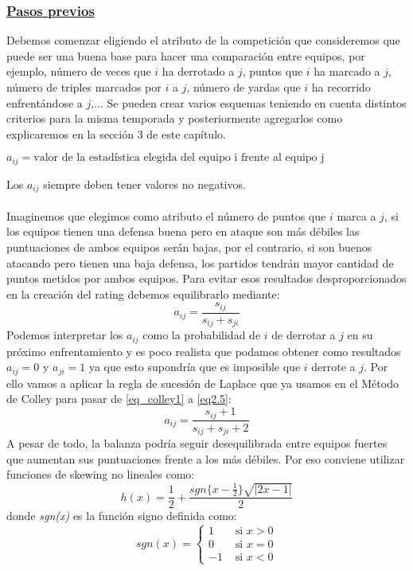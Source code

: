 \subsubsection*{\underline{Pasos previos}}
Debemos comenzar eligiendo el atributo de la competición que consideremos que puede ser una buena base para hacer una comparación entre equipos, por ejemplo, número de veces que $i$ ha derrotado a $j$, puntos que $i$ ha marcado a $j$, número de triples marcados por $i$ a $j$, número de yardas que $i$ ha recorrido enfrentándose a $j$,... Se pueden crear varios esquemas teniendo en cuenta distintos criterios para la misma temporada y posteriormente agregarlos como explicaremos en la sección 3 de este capítulo.
\begin{center}
	$a_{ij} = \text{valor de la estadística elegida del equipo i frente al equipo j}$
\end{center}
Los $a_{ij}$ siempre deben tener valores no negativos.\\
\\
Imaginemos que elegimos como atributo el número de puntos que $i$ marca a $j$, si los equipos tienen una defensa buena pero en ataque son más débiles las puntuaciones de ambos equipos serán bajas, por el contrario, si son buenos atacando pero tienen una baja defensa, los partidos tendrán mayor cantidad de puntos metidos por ambos equipos. Para evitar esos resultados desproporcionados en la creación del rating debemos equilibrarlo mediante:
\begin{equation}
a_{ij} = \dfrac{s_{ij}}{s_{ij}+s_{ji}}
\end{equation}
Podemos interpretar los $a_{ij}$ como la probabilidad de $i$ de derrotar a $j$ en su próximo enfrentamiento y es poco realista que podamos obtener como resultados $a_{ij}=0$ y $a_{ji}=1$ ya que esto supondría que es imposible que $i$ derrote a $j$. Por ello vamos a aplicar la regla de sucesión de Laplace que ya usamos en el Método de Colley para pasar de \ref{eq_colley1} a \ref{eq2.5}:
\begin{equation}
a_{ij} = \dfrac{s_{ij}+1}{s_{ij}+s_{ji}+2} \label{formejem6}
\end{equation}
A pesar de todo, la balanza podría seguir desequilibrada entre equipos fuertes que aumentan sus puntuaciones frente a los más débiles. Por eso conviene utilizar funciones de skewing no lineales como:
\begin{equation}
h(x) = \frac{1}{2} + \dfrac{sgn\{x-\frac{1}{2}\} \sqrt{|2x-1|}}{2} 
\end{equation} 
donde \textit{sgn(x)} es la función signo definida como:
\begin{equation*}
sgn(x) = \begin{cases}
1 & \text{ si } x>0\\
0 & \text{ si } x=0\\
-1 & \text{ si } x<0 
\end{cases}
\end{equation*}


